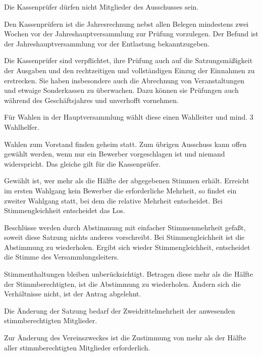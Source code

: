 \documentclass[10pt,a4paper,parskip=half]{scrartcl}
\begin{document}
\begin{contract}
    Die Kassenprüfer dürfen nicht Mitglieder des Ausschusses sein.
    
    Den Kassenprüfern ist die Jahresrechnung nebst allen Belegen mindestens zwei Wochen vor der Jahreshauptversammlung zur Prüfung vorzulegen. 
    Der Befund ist der Jahreshauptversammlung vor der Entlastung bekanntzugeben.
    
    Die Kassenprüfer sind verpflichtet,
    ihre Prüfung auch auf die Satzungsmäßigkeit der Ausgaben und den rechtzeitigen und vollständigen Einzug der Einnahmen zu erstrecken.
    Sie haben insbesondere auch die Abrechnung von Veranstaltungen und etwaige Sonderkassen zu überwachen.
    Dazu können sie Prüfungen auch während des Geschäftsjahres und unverhofft vornehmen.
    
    \label{C:WahlenUndAbstimmungen}
    Für Wahlen in der Hauptversammlung wählt diese einen Wahlleiter und mind. 3 Wahlhelfer.
    
    Wahlen zum Vorstand finden geheim statt.
    Zum übrigen Ausschuss kann offen gewählt werden,
    wenn nur ein Bewerber vorgeschlagen ist und niemand widerspricht.
    Das gleiche gilt für die Kassenprüfer.
    
    Gewählt ist,
    wer mehr als die Hälfte der abgegebenen Stimmen erhält.
    Erreicht im ersten Wahlgang kein Bewerber die erforderliche Mehrheit,
    so findet ein zweiter Wahlgang statt,
    bei dem die relative Mehrheit entscheidet.
    Bei Stimmengleichheit entscheidet das Los.
    
    Beschlüsse werden durch Abstimmung mit einfacher Stimmenmehrheit gefaßt,
    soweit diese Satzung nichts anderes vorschreibt.
    Bei Stimmengleichheit ist die Abstimmung zu wiederholen.
    Ergibt sich wieder Stimmengleichheit,
    entscheidet die Stimme des Versammlungsleiters.
    
    Stimmenthaltungen bleiben unberücksichtigt.
    Betragen diese mehr als die Hälfte der Stimmberechtigten,
    ist die Abstimmung zu wiederholen.
    Ändern sich die Verhältnisse nicht,
    ist der Antrag abgelehnt.
    
    Die Änderung der Satzung bedarf der Zweidrittelmehrheit der anwesenden stimmberechtigten Mitglieder.
    
    Zur Änderung des Vereinszweckes ist die Zustimmung von mehr als der Hälfte aller stimmberechtigten Mitglieder erforderlich.
    

\end{contract}
\end{document}
